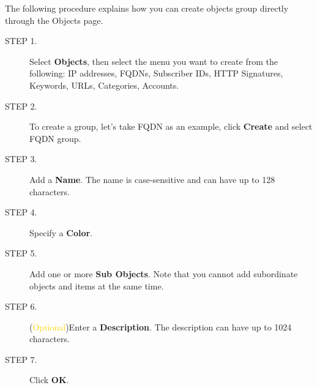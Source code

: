 The following procedure explains how you can create objects group directly through the Objects page.

\begin{description}
    \item[STEP 1.]	Select \textbf{Objects}, then select the menu you want to create from the following: IP addresses, FQDNs, Subscriber IDs, HTTP Signatures, Keywords, URLs, Categories, Accounts.
    \item[STEP 2.]	To create a group, let’s take FQDN as an example, click \textbf{Create} and select FQDN group.
    \item[STEP 3.]	Add a \textbf{Name}. The name is case-sensitive and can have up to 128 characters.
    \item[STEP 4.]	Specify a \textbf{Color}.
    \item[STEP 5.]	Add one or more \textbf{Sub Objects}. Note that you cannot add subordinate objects and items at the same time.
    \item[STEP 6.]	(\textcolor{gold}{Optional})Enter a \textbf{Description}. The description can have up to 1024 characters.
    \item[STEP 7.]	Click \textbf{OK}.    
\end{description}